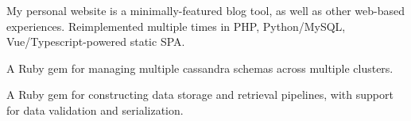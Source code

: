 \documentclass[11pt,a4paper,sans]{moderncv}
\begin{document}
  {My personal website is a minimally-featured blog tool, as well as other web-based experiences. Reimplemented multiple times in PHP, Python/MySQL, Vue/Typescript-powered static SPA.}

  {A Ruby gem for managing multiple cassandra schemas across multiple clusters.}

  {A Ruby gem for constructing data storage and retrieval pipelines, with support for data validation and serialization.}
\end{document}
